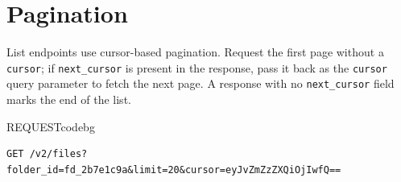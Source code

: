 \section{Pagination}
\label{sec:pagination}
List endpoints use cursor-based pagination. Request the first page without a
\texttt{cursor}; if \texttt{next\_cursor} is present in the response, pass it back as the
\texttt{cursor} query parameter to fetch the next page. A response with no
\texttt{next\_cursor} field marks the end of the list.

\begin{jsonpanel}{REQUEST}{codebg}
\begin{lstlisting}
GET /v2/files?folder_id=fd_2b7e1c9a&limit=20&cursor=eyJvZmZzZXQiOjIwfQ==
\end{lstlisting}
\end{jsonpanel}

